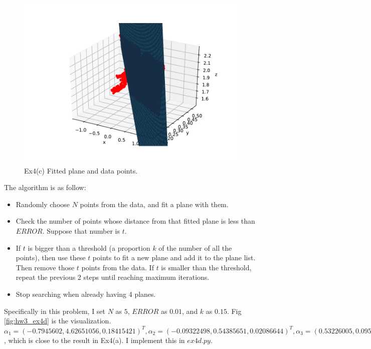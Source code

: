 \documentclass[
  course = {{16-811 Math Fundamentals for Robotics}},
  quartile = {{1}},
  assignment = 3,
  name = {{Kangle Deng}},
  email = {{kangled@andrew.cmu.edu}},
  firstexercise = 1
]{aga-homework}
\begin{document}
\begin{figure}
    \centering
    \includegraphics{math/fig/hw3/ex4c.pdf}
    \caption{Ex4(c) Fitted plane and data points.}
    \label{fig:hw3_ex4c}
\end{figure}

\subexercise
The algorithm is as follow:
\begin{itemize}
    \item Randomly choose $N$ points from the data, and fit a plane with them.
    \item Check the number of points whose distance from that fitted plane is less than $ERROR$. Suppose that number is $t$.
    \item If $t$ is bigger than a threshold (a proportion $k$ of the number of all the points), then use these $t$ points to fit a new plane and add it to the plane list. Then remove those $t$ points from the data. If $t$ is smaller than the threshold, repeat the previous 2 steps until reaching maximum iterations.
    \item Stop searching when already having 4 planes.
\end{itemize}

Specifically in this problem, I set $N$ as $5$, $ERROR$ as $0.01$, and $k$ as $0.15$. Fig \ref{fig:hw3_ex4d} is the visualization. $\alpha_1 = (-0.7945602,   4.62651056,  0.18415421)^T,\alpha_2 = (-0.09322498,  0.54385651,  0.02086644)^T,\alpha_3=(0.53226005,  0.09583805, -0.11503434)^T,\alpha_4 = (4.44086799,  0.77447499, -0.90945754)^T$, which is close to the result in Ex4(a). I implement this in $ex4d.py$.
\end{document}
